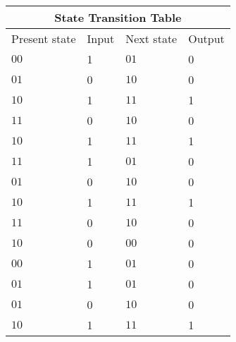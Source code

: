 


\begin{tabular}{ |p{1cm}|p{1cm}|p{1cm}|p{1cm}| }
\hline
\multicolumn{4}{|c|}{State Transition Table} \\
\hline
Present state & Input & Next state & Output  \\
\hline
 $00$ & 1 & $01$ &0 \\
\hline
$01$ & 0 & $10$  &0\\
\hline
$10$ & 1 & $11$  &1\\
\hline
$11$ & 0 & $10$  &0\\
\hline
$10$ & 1 & $11$  &1\\
\hline
$11$ & 1 & $01$  &0\\
\hline
$01$ & 0 & $10$  &0\\
\hline
$10$ & 1 & $11$  &1\\
\hline
$11$ & 0 & $10$  &0\\
\hline
$10$ & 0 & $00$  &0\\
\hline
$00$ & 1 & $01$  &0\\
\hline
$01$ & 1 & $01$  &0\\
\hline
$01$ & 0 & $10$  &0\\
\hline
$10$ & 1 & $11$  &1\\
\hline

\end{tabular}
